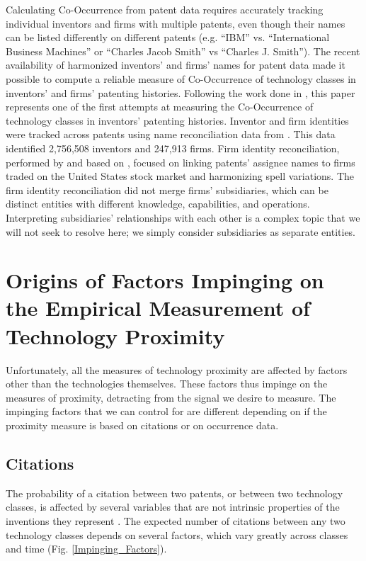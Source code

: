 \documentclass[]{svjour3}
\begin{document}
Calculating Co-Occurrence from patent data requires accurately tracking individual inventors and firms with multiple patents, even though their names can be listed differently on different patents (e.g. ``IBM'' vs. ``International Business Machines'' or ``Charles Jacob Smith'' vs ``Charles J. Smith''). The recent availability of harmonized inventors' and firms' names for patent data \citep{Li2014} made it possible to compute a reliable measure of Co-Occurrence of technology classes in inventors' and firms' patenting histories. Following the work done in \citep{Yan2015}, this paper represents one of the first attempts at measuring the Co-Occurrence of technology classes in inventors' patenting histories. Inventor and firm identities were tracked across patents using name reconciliation data from \citep{Li2014}. This data identified 2,756,508 inventors and 247,913 firms. Firm identity reconciliation, performed by \citep{Li2014} and based on \citep{Hall2001}, focused on linking patents' assignee names to firms traded on the United States stock market and harmonizing spell variations. The firm identity reconciliation did not merge firms' subsidiaries, which can be distinct entities with different knowledge, capabilities, and operations. Interpreting subsidiaries' relationships with each other is a complex topic that we will not seek to resolve here; we simply consider subsidiaries as separate entities.

\section{Origins of Factors Impinging on the Empirical Measurement of Technology Proximity}

Unfortunately, all the measures of technology proximity are affected by factors other than the technologies themselves. These factors thus impinge on the measures of proximity, detracting from the signal we desire to measure. The impinging factors that we can control for are different depending on if the proximity measure is based on citations or on occurrence data.

\subsection{Citations}
The probability of a citation between two patents, or between two technology classes, is affected by several variables that are not intrinsic properties of the inventions they represent \citep{Hall2001, Uzzi2013}. The expected number of citations between any two technology classes depends on several factors, which vary greatly across classes and time (Fig. \ref{Impinging_Factors}).
\end{document}
